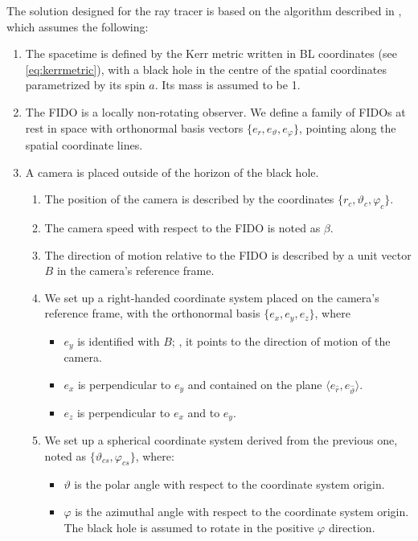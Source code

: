 The solution designed for the ray tracer is based on the algorithm described in \cite{thorne15}, which assumes the following:
\begin{enumerate}
	\item The spacetime is defined by the Kerr metric written in \ac{BL} coordinates (see \autoref{eq:kerrmetric}), with a black hole in the centre of the spatial coordinates parametrized by its spin $a$. Its mass is assumed to be 1.
	\item The \ac{FIDO} is a locally non-rotating observer. We define a family of \acp{FIDO} at rest in space with orthonormal basis vectors $\{e_r, e_\vartheta, e_\varphi\}$, pointing along the spatial coordinate lines.
	\item A camera is placed outside of the horizon of the black hole.
	\begin{enumerate}
		\item The position of the camera is described by the coordinates $\{r_c, \vartheta_c, \varphi_c\}$.
		\item The camera speed with respect to the \ac{FIDO} is noted as $\beta$.
		\item The direction of motion relative to the \ac{FIDO} is described by a unit vector $B$ in the camera's reference frame.
		\item We set up a right-handed coordinate system placed on the camera's reference frame, with the orthonormal basis $\{e_x, e_y, e_z\}$, where
		\begin{itemize}
			\item $e_y$ is identified with $B$; \ie, it points to the direction of motion of the camera.
			\item $e_x$ is perpendicular to $e_y$ and contained on the plane $\langle e_{\widehat{r}}, e_{\widehat{\vartheta}} \rangle$.
			\item $e_z$ is perpendicular to $e_x$ and to $e_y$.
		\end{itemize}
		\item We set up a spherical coordinate system derived from the previous one, noted as $\{\vartheta_{cs}, \varphi_{cs}\}$, where:
		\begin{itemize}
			\item $\vartheta$ is the polar angle with respect to the coordinate system origin.
			\item $\varphi$ is the azimuthal angle with respect to the coordinate system origin. The black hole is assumed to rotate in the positive $\varphi$ direction.
		\end{itemize}
	\end{enumerate}
\end{enumerate}

